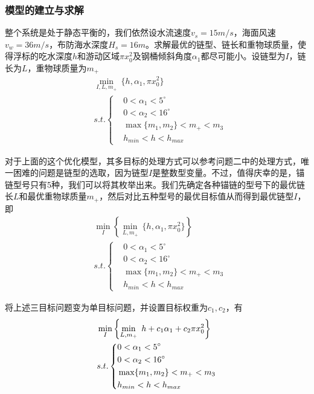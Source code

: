 \documentclass[UTF8]{ctexbook}
\theoremstyle{nonumberplain}
\begin{document}
        \subsubsection{模型的建立与求解}
            \par
            整个系统是处于静态平衡的，我们依然设水流速度$v_s=15m/s$，海面风速$v_w=36m/s$，布防海水深度$H_s=16m$。求解最优的链型、链长和重物球质量，使得浮标的吃水深度$h$和游动区域$\pi x_0^2$及钢桶倾斜角度$\alpha_1$都尽可能小。设链型为$I$，链长为$L$，重物球质量为$m_+$
            \begin{align*}
            & \min_{I,L,m_+} \ \{h,\alpha_1,\pi x_0^2\}\\
            & s.t.\left\{
            \begin{aligned}
            & 0<\alpha_1<5^\circ\\
            & 0<\alpha_2<16^\circ\\
            & \max\{m_1,m_2\}<m_+<m_3\\
            & h_{min}<h<h_{max}
            \end{aligned}
            \right.
            \end{align*}
            \par
            对于上面的这个优化模型，其多目标的处理方式可以参考问题二中的处理方式，唯一困难的问题是链型的选取，因为链型$I$是整数型变量。不过，值得庆幸的是，锚链型号只有5种，我们可以将其枚举出来。我们先确定各种锚链的型号下的最优链长$L$和最优重物球质量$m_+$，然后对比五种型号的最优目标值从而得到最优链型$I$，即
            \begin{align*}
            & \min_{I}\left\{\min_{L,m_+}\ \{h,\alpha_1,\pi x_0^2\}\right\} \\
            & s.t.\left\{
            \begin{aligned}
            & 0<\alpha_1<5^\circ\\
            & 0<\alpha_2<16^\circ\\
            & \max\{m_1,m_2\}<m_+<m_3\\
            & h_{min}<h<h_{max}
            \end{aligned}
            \right.
            \end{align*}
            \par
            将上述三目标问题变为单目标问题，并设置目标权重为$c_1,c_2$，有
            \begin{align}
            \label{系泊系统优化模型5}
            & \min_{I}\left\{\min_{L,m_+}\ h+c_1\alpha_1+c_2\pi x_0^2\right\} \\
            & s.t.\left\{
            \begin{aligned}
            & 0<\alpha_1<5^\circ\\
            & 0<\alpha_2<16^\circ\\
            & \max\{m_1,m_2\}<m_+<m_3\\
            & h_{min}<h<h_{max}
            \end{aligned}
            \right.\notag
            \end{align}
\end{document}
